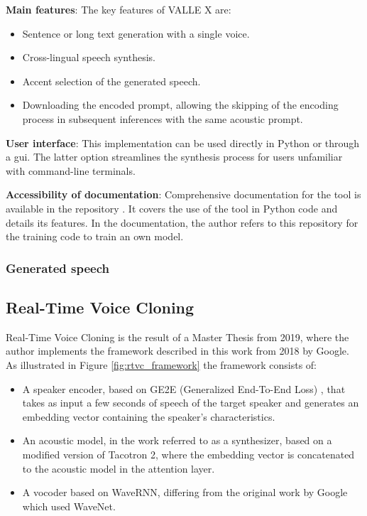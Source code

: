 \textbf{Main features}:
The key features of VALLE X are:
\begin{itemize}
    \item Sentence or long text generation with a single voice.
    \item Cross-lingual speech synthesis.
    \item Accent selection of the generated speech.
    \item Downloading the encoded prompt, allowing the skipping of the encoding process in subsequent inferences with the same acoustic prompt.
\end{itemize}

\textbf{User interface}:
This implementation can be used directly in Python or through a \gls{gui}. The latter option streamlines the synthesis process for users unfamiliar with command-line terminals.

\textbf{Accessibility of documentation}: Comprehensive documentation for the tool is available in the repository \cite{songting_vall-e_2023}. It covers the use of the tool in Python code and details its features. In the documentation, the author refers to this repository \cite{valle} for the training code to train an own model.

\subsubsection{Generated speech}

\subsection{Real-Time Voice Cloning}
Real-Time Voice Cloning is the result of a Master Thesis \cite{jemine2019master} from 2019, where the author implements the framework described in this work \cite{jia2018transfer} from 2018 by Google.
As illustrated in Figure \ref{fig:rtvc_framework} the framework consists of:

\begin{itemize}
    \item A speaker encoder, based on GE2E (Generalized End-To-End Loss) \cite{wan2018generalized}, that takes as input a few seconds of speech of the target speaker and generates an embedding vector containing the speaker's characteristics.
    \item An acoustic model, in the work referred to as a synthesizer, based on a modified version of Tacotron 2, where the embedding vector is concatenated to the acoustic model in the attention layer. 
    \item A vocoder based on WaveRNN, differing from the original work by Google \cite{jia2018transfer} which used WaveNet. 
\end{itemize}


